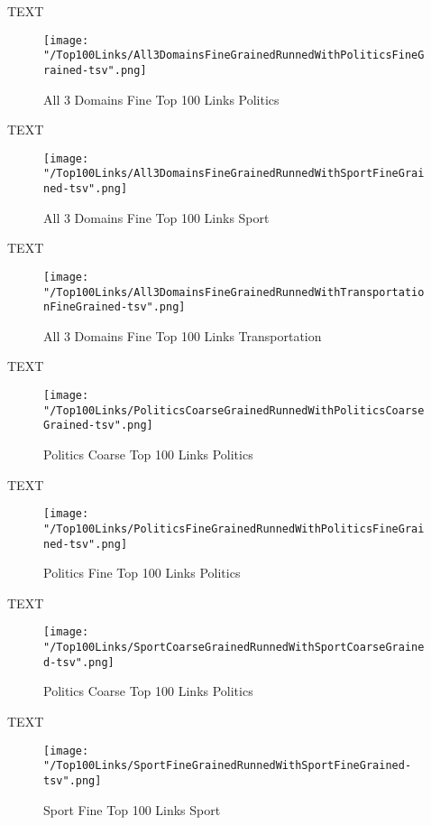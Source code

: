 \documentclass[thesis=M,english]{FITthesis}[2012/10/20]
\begin{document}
	TEXT

	\begin{figure}\centering
		\texttt{[image: "/Top100Links/All3DomainsFineGrainedRunnedWithPoliticsFineGrained-tsv".png]}
		\caption{All 3 Domains Fine Top 100 Links Politics}\label{}
	\end{figure}	

	TEXT	

	\begin{figure}\centering
		\texttt{[image: "/Top100Links/All3DomainsFineGrainedRunnedWithSportFineGrained-tsv".png]}
		\caption{All 3 Domains Fine Top 100 Links Sport}\label{}
	\end{figure}
	
		TEXT	

	\begin{figure}\centering
		\texttt{[image: "/Top100Links/All3DomainsFineGrainedRunnedWithTransportationFineGrained-tsv".png]}
		\caption{All 3 Domains Fine Top 100 Links Transportation}\label{}	
	\end{figure}
	
	TEXT

	\begin{figure}\centering
		\texttt{[image: "/Top100Links/PoliticsCoarseGrainedRunnedWithPoliticsCoarseGrained-tsv".png]}
		\caption{Politics Coarse Top 100 Links Politics}\label{}
	\end{figure}	

	TEXT	

	\begin{figure}\centering
		\texttt{[image: "/Top100Links/PoliticsFineGrainedRunnedWithPoliticsFineGrained-tsv".png]}
		\caption{Politics Fine Top 100 Links Politics}\label{}
	\end{figure}

	
	TEXT

	\begin{figure}\centering
		\texttt{[image: "/Top100Links/SportCoarseGrainedRunnedWithSportCoarseGrained-tsv".png]}
		\caption{Politics Coarse Top 100 Links Politics}\label{}
	\end{figure}		
	
		TEXT	

	\begin{figure}\centering
		\texttt{[image: "/Top100Links/SportFineGrainedRunnedWithSportFineGrained-tsv".png]}
		\caption{Sport Fine Top 100 Links Sport}\label{}	
	\end{figure}
\end{document}
